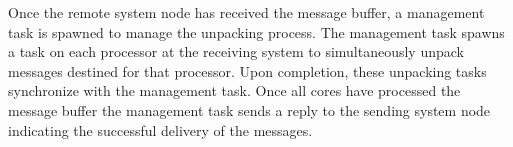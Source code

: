 Once the remote system node has received the message buffer, a management task is spawned to manage the unpacking process.  The management task spawns a task on each processor at the receiving system to simultaneously unpack messages destined for that processor.  Upon completion, these unpacking tasks synchronize with the management task.  Once all cores have processed the message buffer the management task sends a reply to the sending system node indicating the successful delivery of the messages.




%
%
%
%
%
% 
% 
% 
